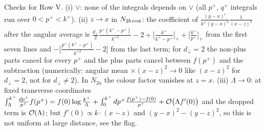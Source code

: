 \documentclass[9pt]{article}
\numberwithin{equation}{section}
\begin{document}
\noindent Checks for Row V. (i) $\vee$: none of the integrals depends on $\vee$ (all $p^{+}$, $q^{+}$ integrals run over $0<p^{+}<k^{+}$). (ii) $z\to x$ in $N_{2b\,\rm rest}$: the coefficient of $\frac{(y-x)^{i}}{k^{+}(y-x)^{2}}\frac{1}{(x-z)^{2}}$ after the angular average is $\frac{d_{\perp}}{2}\frac{p^{+}(k^{+}-p^{+})}{k^{+2}}-2+\big[\frac{k^{+}}{k^{+}-p^{+}}\big]_{+}+\big[\frac{k^{+}}{p^{+}}\big]_{+}$ from the first seven lines and $-\big[\frac{p^{+}(k^{+}-p^{+})}{k^{+2}}-2\big]$ from the last term; for $d_{\perp}=2$ the non-plus parts cancel for every $p^{+}$ and the plus parts cancel between $f(p^{+})$ and the subtraction (numerically: angular mean $\times(x-z)^{2}\to0$ like $(x-z)^{2}$ for $d_{\perp}=2$, not for $d_{\perp}\neq2$). In $N_{2a}$ the colour factor vanishes at $z=x$. (iii) $\Lambda\to0$: at fixed transverse coordinates $\int_{\Lambda}^{k^{+}}\frac{dp^{+}}{p^{+}}f(p^{+})=f(0)\log\frac{k^{+}}{\Lambda}+\int_{0}^{k^{+}}dp^{+}\frac{f(p^{+})-f(0)}{p^{+}}+{\cal O}\big(\Lambda f'(0)\big)$ and the dropped term is ${\cal O}(\Lambda)$; but $f'(0)\propto k\cdot(x-z)$ and $(y-x)^{2}-(y-z)^{2}$, so this is not uniform at large distance, see the flag.
\end{document}
